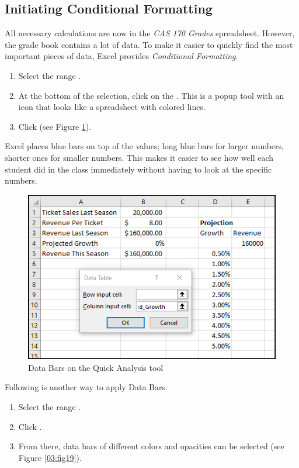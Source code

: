 \subsection{Initiating Conditional Formatting}

All necessary calculations are now in the \textit{CAS 170 Grades} spreadsheet. However, the grade book contains a lot of data. To make it easier to quickly find the most important pieces of data, Excel provides \textit{Conditional Formatting}.

\begin{enumerate}
	\item Select the range .
	\item At the bottom of the selection, click on the . This is a popup tool with an icon that looks like a spreadsheet with colored lines.
	\item Click  (see Figure \ref{03:fig18}).
\end{enumerate}

Excel places blue bars on top of the values; long blue bars for larger numbers, shorter ones for smaller numbers. This makes it easier to see how well each student did in the class immediately without having to look at the specific numbers.

\begin{figure}[H]
	\centering
	\includegraphics[width=\maxwidth{.95\linewidth}]{gfx/ch03_fig18}
	\caption{Data Bars on the Quick Analysis tool}
	\label{03:fig18}
\end{figure}

Following is another way to apply Data Bars.

\begin{enumerate}
	\item Select the range .
	\item Click . 	
	\item From there, data bars of different colors and opacities can be selected (see Figure \ref{03:fig19}).
\end{enumerate}

